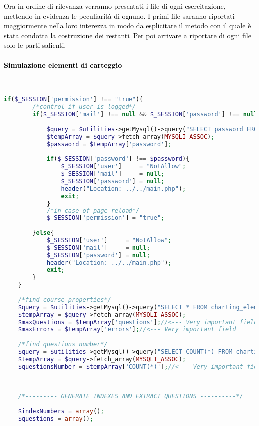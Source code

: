 \textcolor{black}{Ora in ordine di rilevanza verranno presentati i file di ogni esercitazione, mettendo in evidenza le peculiarità di ognuno. I primi file saranno riportati maggiormente nella loro interezza in modo da esplicitare il metodo con il quale è stata condotta la costruzione dei restanti. Per poi arrivare a riportare di ogni file solo le parti salienti.}\\

\paragraph{\textcolor{black}{Simulazione elementi di carteggio}}\leavevmode\\

\begin{lstlisting}[language=php]
	if($_SESSION['permission'] !== "true"){
		/*control if user is logged*/
		if($_SESSION['mail'] !== null && $_SESSION['password'] !== null){
			
			$query = $utilities->getMysql()->query("SELECT password FROM user_table1 WHERE (email = '{$_SESSION['mail']}')");
			$tempArray = $query->fetch_array(MYSQLI_ASSOC);
			$password = $tempArray['password'];
			
			if($_SESSION['password'] !== $password){
				$_SESSION['user']     = "NotAllow";
				$_SESSION['mail']     = null;
				$_SESSION['password'] = null;
				header("Location: ../../main.php");
				exit;
			}
			/*in case of page reload*/
			$_SESSION['permission'] = "true";
			
		}else{
			$_SESSION['user']     = "NotAllow";
			$_SESSION['mail']     = null;
			$_SESSION['password'] = null;
			header("Location: ../../main.php");
			exit;
		}
	}
	
	/*find course properties*/
	$query = $utilities->getMysql()->query("SELECT * FROM charting_elements_properties WHERE (id = '1')");
	$tempArray = $query->fetch_array(MYSQLI_ASSOC);
	$maxQuestions = $tempArray['questions'];//<--- Very important field
	$maxErrors = $tempArray['errors'];//<--- Very important field
	
	/*find questions number*/
	$query = $utilities->getMysql()->query("SELECT COUNT(*) FROM charting_elements");
	$tempArray = $query->fetch_array(MYSQLI_ASSOC);
	$questionsNumber = $tempArray['COUNT(*)'];//<--- Very important field
	
	
	
	/*--------- GENERATE INDEXES AND EXTRACT QUESTIONS ----------*/
	
	$indexNumbers = array();
	$questions = array();
	

\end{lstlisting}

